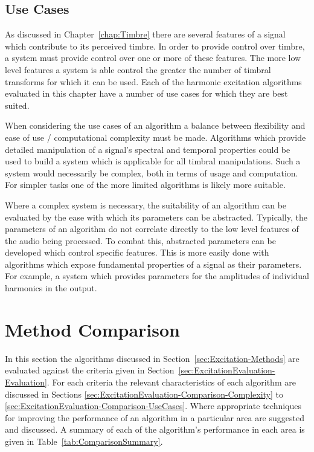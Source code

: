 	\subsection{Use Cases}
	\label{sec:ExcitationEvaluation-Evaluation-UseCases}
		As discussed in Chapter~\ref{chap:Timbre} there are several features of a signal which contribute to its
		perceived timbre. In order to provide control over timbre, a system must provide control over one or more
		of these features. The more low level features a system is able control the greater the number of timbral
		transforms for which it can be used. Each of the harmonic excitation algorithms evaluated in this chapter
		have a number of use cases for which they are best suited.
		
		When considering the use cases of an algorithm a balance between flexibility and ease of use /
		computational complexity must be made. Algorithms which provide detailed manipulation of a signal's
		spectral and temporal properties could be used to build a system which is applicable for all timbral
		manipulations. Such a system would necessarily be complex, both in terms of usage and computation. For
		simpler tasks one of the more limited algorithms is likely more suitable.
		
		Where a complex system is necessary, the suitability of an algorithm can be evaluated by the ease with
		which its parameters can be abstracted. Typically, the parameters of an algorithm do not correlate directly
		to the low level features of the audio being processed. To combat this, abstracted parameters can be
		developed which control specific features. This is more easily done with algorithms which expose
		fundamental properties of a signal as their parameters. For example, a system which provides parameters
		for the amplitudes of individual harmonics in the output.

\section{Method Comparison}
\label{sec:ExcitationEvaluation-Comparison}
	In this section the algorithms discussed in Section~\ref{sec:Excitation-Methods} are evaluated against the criteria
	given in Section~\ref{sec:ExcitationEvaluation-Evaluation}. For each criteria the relevant characteristics of each
	algorithm are discussed in Sections \ref{sec:ExcitationEvaluation-Comparison-Complexity} to
	\ref{sec:ExcitationEvaluation-Comparison-UseCases}. Where appropriate techniques for improving the performance of
	an algorithm in a particular area are suggested and discussed. A summary of each of the algorithm's performance in
	each area is given in Table~\ref{tab:ComparisonSummary}.

